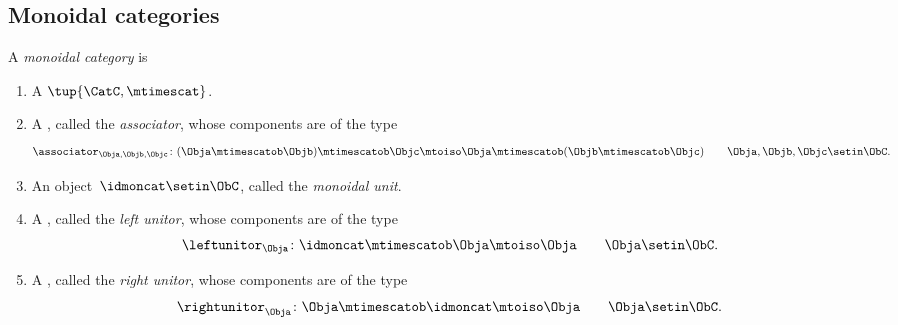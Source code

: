 \subsection{Monoidal categories}

%

\begin{ctdefinition}
    \label{def:monoidal-cat}
    A \emph{monoidal category} is

    \constit
    \begin{enumerate}
        \item A  $\tup{\CatC, \mtimescat}$.
        \item A , called the \emph{associator}, whose components are of the type
              \begin{equation}
                  \associator_{\Obja,\Objb,\Objc}\colon (\Obja \mtimescatob \Objb )\mtimescatob \Objc \mtoiso \Obja\mtimescatob (\Objb \mtimescatob \Objc) \quad \quad \Obja,\Objb,\Objc\setin \ObC.
              \end{equation}
        \item An object~$\idmoncat \setin \ObC$, called the \emph{monoidal unit}.
        \item A , called the \emph{left unitor}, whose components are of the type
              \begin{equation}
                  \leftunitor_\Obja \colon \idmoncat\mtimescatob \Obja \mtoiso \Obja \quad \quad \Obja\setin \ObC.
              \end{equation}
        \item A , called the \emph{right unitor}, whose components are of the type
              \begin{equation}
                  \rightunitor_\Obja \colon \Obja \mtimescatob \idmoncat \mtoiso \Obja \quad \quad \Obja\setin \ObC.
              \end{equation}
    \end{enumerate}


\end{ctdefinition}
